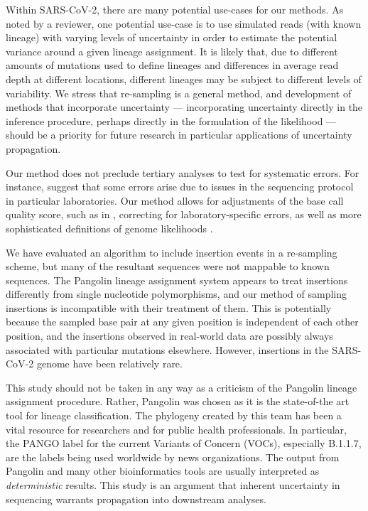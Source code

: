 \documentclass[12pt]{article}
\begin{document}
Within SARS-CoV-2, there are many potential use-cases for our methods.
As noted by a reviewer, one potential use-case is to use simulated reads (with known lineage) with varying levels of uncertainty in order to estimate the potential variance around a given lineage assignment.
It is likely that, due to different amounts of mutations used to define lineages and differences in average read depth at different locations, different lineages may be subject to different levels of variability.
We stress that re-sampling is a general method, and development of methods that incorporate uncertainty --- \eg incorporating uncertainty directly in the inference procedure, perhaps directly in the formulation of the likelihood --- should be a priority for future research in particular applications of uncertainty propagation.

Our method does not preclude tertiary analyses to test for systematic errors.
For instance, \cite{demaioIssuesSARSCoV2Sequencing2020} suggest that some errors arise due to issues in the sequencing protocol in particular laboratories.
Our method allows for adjustments of the base call quality score, such as in \cite{brockmanQualityScoresSNP2008}, correcting for laboratory-specific errors, as well as more sophisticated definitions of genome likelihoods \cite[\eg ][]{liAdjustQualityScores2004, depristoFrameworkVariationDiscovery2011, liSNPDetectionMassively2009}.

We have evaluated an algorithm to include insertion events in a re-sampling scheme, but many of the resultant sequences were not mappable to known sequences.
The Pangolin lineage assignment system appears to treat insertions differently from single nucleotide polymorphisms, and our method of sampling insertions is incompatible with their treatment of them.
This is potentially because the sampled base pair at any given position is independent of each other position, and the insertions observed in real-world data are possibly always associated with particular mutations elsewhere.
However, insertions in the SARS-CoV-2 genome have been relatively rare.

This study should not be taken in any way as a criticism of the Pangolin lineage assignment procedure.
Rather, Pangolin was chosen as it is the state-of-the art tool for lineage classification.
The phylogeny created by this team has been a vital resource for researchers and for public health professionals.
In particular, the PANGO label for the current Variants of Concern (VOCs), especially B.1.1.7, are the labels being used worldwide by news organizations.
The output from Pangolin and many other bioinformatics tools are usually interpreted as \emph{deterministic} results.
This study is an argument that inherent uncertainty in sequencing warrants propagation into downstream analyses.



\end{document}
